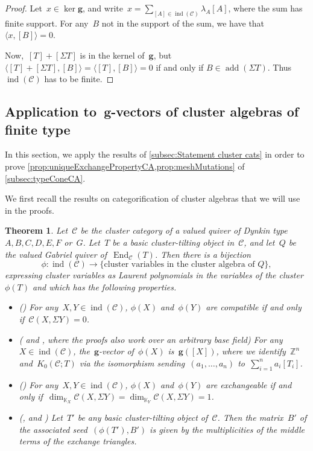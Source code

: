 \documentclass{amsart}
\newtheorem{theorem}{Theorem}[section]
\theoremstyle{definition}
\newcommand{\Z}{\mathbb{Z}} %
\renewcommand{\b}[1]{{\boldsymbol{#1}}} %
\newcommand{\field}{\mathbb{K}}
\newcommand{\cat}{\mathcal{C}}
\newcommand{\susp}{\Sigma}
\newcommand{\add}{\operatorname{add}}
\newcommand{\End}[1]{\operatorname{End}_{#1}}
\newcommand{\ind}{\operatorname{ind}}
\newcommand{\CC}{\phi}
\begin{document}
\begin{proof}
Let~$x \in \ker \b{g}$, and write~$x = \sum_{[A] \in \ind(\cat)} \lambda_A[A]$, where the sum has finite support. For any~$B$ not in the support of the sum, we have that~$\langle x, [B] \rangle = 0$.
 
Now,~$[T]+[\susp T]$ is in the kernel of~$\b{g}$, but~$\langle [T] + [\susp T], [B] \rangle = \langle [T], [B] \rangle = 0$ if and only if ${B \in \add(\susp T)}$. Thus~$\ind(\cat)$ has to be finite.
\end{proof}


\subsection{Application to~$\b{g}$-vectors of cluster algebras of finite type}
\label{sec:applications-g-vectors}

In this section, we apply the results of \cref{subsec:Statement cluster cats} in order to prove \cref{prop:uniqueExchangePropertyCA,prop:meshMutations} of \cref{subsec:typeConeCA}.

We first recall the results on categorification of cluster algebras that we will use in the proofs.
\begin{theorem}
\label{thm:categorification}
Let~$\cat$ be the cluster category of a valued quiver of Dynkin type~$A,B,C,D,E,F$ or~$G$. Let~$T$ be a basic cluster-tilting object in~$\cat$, and let~$Q$ be the valued Gabriel quiver of~$\End{\cat}(T)$. Then there is a bijection
\[
\CC: \ind(\cat) \xrightarrow{} \{\textrm{cluster variables in the cluster algebra of~$Q$}\},
\]
expressing cluster variables as Laurent polynomials in the variables of the cluster~$\CC(T)$ and which has the following properties.
\begin{itemize}
\item[(i)] \emph{(}\cite[Prop.~3.2]{BuanMarshReinekeReitenTodorov}\emph{)} For any~$X,Y \in \ind(\cat)$, $\CC(X)$ and~$\CC(Y)$ are compatible if and only if~$\cat(X, \susp Y) = 0$.
\item[(ii)] \emph{(}\cite[Prop.~4.3]{FuKeller} and \cite[Prop.~2.2]{Palu}, where the proofs also work over an arbitrary base field\emph{)} For any~$X \in \ind(\cat)$, the~$\b{g}$-vector of~$\CC(X)$ is~$\b{g}([X])$, where we identify~$\Z^n$ and~$K_0(\cat ; T)$ via the isomorphism sending~$(a_1, \dots, a_n)$ to~$\sum_{i=1}^n a_i [T_i]$.
\item[(iii)] \emph{(}\cite[Thm.~7.5]{BuanMarshReinekeReitenTodorov}\emph{)} For any~$X,Y \in \ind(\cat)$, $\CC(X)$ and~$\CC(Y)$ are exchangeable if and only if~$\dim_{\field_X}\cat(X, \susp Y) = \dim_{\field_Y}\cat(X, \susp Y) = 1$.
\item[(iv)]\emph{(}\cite{BuanIyamaReitenScott}, \cite[Thm.~5.1]{BuanMarshReiten-mutation} and \cite[Thm.~5.7]{Rupel}\emph{)} Let~$T'$ be any basic cluster-tilting object of~$\cat$. Then the matrix~$B'$ of the associated seed~$(\CC(T'),B')$ is given by the multiplicities of the middle terms of the exchange triangles. 
\end{itemize}
\end{theorem}
\end{document}
